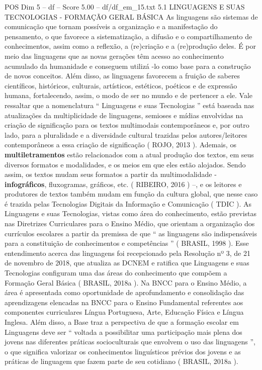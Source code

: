 \begin{textsample}{POS Dim 5 – df – Score 5.00 – df/df\_em\_15.txt}  \label{ex:f5_pos_154}
5.1 LINGUAGENS E SUAS TECNOLOGIAS - FORMAÇÃO GERAL BÁSICA As linguagens são sistemas de comunicação que tornam possíveis a organização e a manifestação do pensamento, o que favorece a sistematização, a difusão e o compartilhamento de conhecimentos, assim como a reflexão, a (re)criação e a (re)produção deles.
É por meio das linguagens que as novas gerações têm acesso ao conhecimento acumulado da humanidade e conseguem utilizá -lo como base para a construção de novos conceitos.
Além disso, as linguagens favorecem a fruição de saberes científicos, históricos, culturais, artísticos, estéticos, poéticos e de expressão humana, fortalecendo, assim, o modo de ser no mundo e de pertencer a ele.
Vale ressaltar que a nomenclatura “ Linguagens e suas Tecnologias ” está baseada nas atualizações da multiplicidade de linguagens, semioses e mídias envolvidas na criação de significação para os textos multimodais contemporâneos e, por outro lado, para a pluralidade e a diversidade cultural trazidas pelos autores/leitores contemporâneos a essa criação de significação ( ROJO, 2013 ).
Ademais, os \textbf{multiletramentos} estão relacionados com a atual produção dos textos, em seus diversos formatos e modalidades, e os meios em que eles estão alojados.
Sendo assim, os textos mudam seus formatos a partir da multimodalidade - \textbf{infográficos}, fluxogramas, gráficos, etc. ( RIBEIRO, 2016 ) –, e os leitores e produtores de textos também mudam em função da cultura global, que nesse caso é trazida pelas Tecnologias Digitais da Informação e Comunicação ( TDIC ).
As Linguagens e suas Tecnologias, vistas como área do conhecimento, estão previstas nas Diretrizes Curriculares para o Ensino Médio, que orientam a organização dos currículos escolares a partir da premissa de que “ as linguagens são indispensáveis para a constituição de conhecimentos e competências ” ( BRASIL, 1998 ).
Esse entendimento acerca das linguagens foi recepcionado pela Resolução nº 3, de 21 de novembro de 2018, que atualiza as DCNEM e ratifica que Linguagens e suas Tecnologias configuram uma das áreas do conhecimento que compõem a Formação Geral Básica ( BRASIL, 2018a ).
Na BNCC para o Ensino Médio, a área é apresentada como oportunidade de aprofundamento e consolidação das aprendizagens elencadas na BNCC para o Ensino Fundamental referentes aos componentes curriculares Língua Portuguesa, Arte, Educação Física e Língua Inglesa.
Além disso, a Base traz a perspectiva de que a formação escolar em Linguagens deve ser “ voltada a possibilitar uma participação mais plena dos jovens nas diferentes práticas socioculturais que envolvem o uso das linguagens ”, o que significa valorizar os conhecimentos linguísticos prévios dos jovens e as práticas de linguagem que fazem parte de seu cotidiano ( BRASIL, 2018a ).

\end{textsample}
